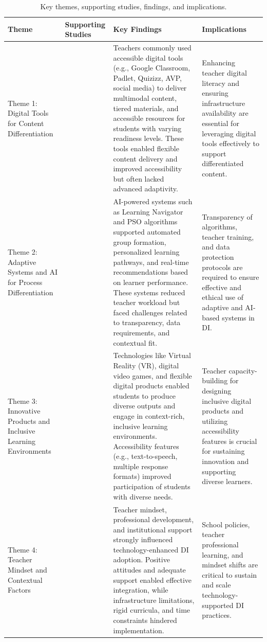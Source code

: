 \documentclass[english]{textolivre}
\begin{document}
\begin{table}[h!]
\centering
\begin{threeparttable}
\small
\caption{Key themes, supporting studies, findings, and implications.}\label{tab-3}
\begin{tabular}{p{2.6cm}p{3.2cm}p{4cm}p{3cm}}
\toprule
Theme & Supporting Studies & Key Findings & Implications \\
\midrule
Theme 1: Digital Tools for Content Differentiation & \textcite{halil2024, hasanah2023, malacapay2019, yuen2023} & Teachers commonly used accessible digital tools (e.g., Google Classroom, Padlet, Quizizz, AVP, social media) to deliver multimodal content, tiered materials, and accessible resources for students with varying readiness levels. These tools enabled flexible content delivery and improved accessibility but often lacked advanced adaptivity. & Enhancing teacher digital literacy and ensuring infrastructure availability are essential for leveraging digital tools effectively to support differentiated content. \\
\addlinespace
Theme 2: Adaptive Systems and AI for Process Differentiation & \textcite{songer2019, zervoudakis2019, forster2018} & AI-powered systems such as Learning Navigator and PSO algorithms supported automated group formation, personalized learning pathways, and real-time recommendations based on learner performance. These systems reduced teacher workload but faced challenges related to transparency, data requirements, and contextual fit. & Transparency of algorithms, teacher training, and data protection protocols are required to ensure effective and ethical use of adaptive and AI-based systems in DI. \\
\addlinespace
Theme 3: Innovative Products and Inclusive Learning Environments & \textcite{wu2019, estaiteyeh2023, spyropoulou2025} & Technologies like Virtual Reality (VR), digital video games, and flexible digital products enabled students to produce diverse outputs and engage in context-rich, inclusive learning environments. Accessibility features (e.g., text-to-speech, multiple response formats) improved participation of students with diverse needs. & Teacher capacity-building for designing inclusive digital products and utilizing accessibility features is crucial for sustaining innovation and supporting diverse learners. \\
\addlinespace
Theme 4: Teacher Mindset and Contextual Factors & \textcite{halil2024, hasanah2023, yuen2023, shareefa2024} & Teacher mindset, professional development, and institutional support strongly influenced technology-enhanced DI adoption. Positive attitudes and adequate support enabled effective integration, while infrastructure limitations, rigid curricula, and time constraints hindered implementation. & School policies, teacher professional learning, and mindset shifts are critical to sustain and scale technology-supported DI practices. \\
\bottomrule
\end{tabular}
\end{threeparttable}
\end{table}
\end{document}
